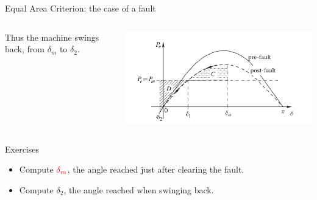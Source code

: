 \begin{frame}[allowframebreaks]{Equal Area Criterion: the case of a fault}
\begin{columns}
\begin{column}{0.5\textwidth}
        Thus the machine swings back, from $\delta_{m}$ to $\delta_{2}$.
    \end{column}
    \begin{column}{0.5\textwidth}
        \begin{center}
        \includegraphics[width=0.9\linewidth]{images/SwingsBack.png}
        \end{center}
    \end{column}
\end{columns}
\begin{block}{Exercises}
    \begin{itemize}
        \item Compute $\mathcolor{red}{\delta_m}$, the angle reached just after clearing the fault.
        \item Compute $\delta_2$, the angle reached when swinging back.
    \end{itemize}
    
\end{block}



\end{frame}
